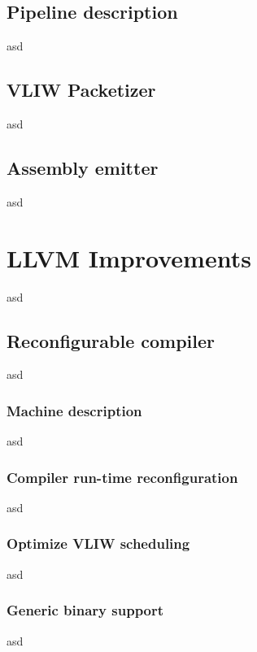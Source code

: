 \subsection{Pipeline description}
asd
\subsection{VLIW Packetizer}
asd
\subsection{Assembly emitter}
asd

\section{LLVM Improvements}
asd
\subsection{Reconfigurable compiler}
asd
\subsubsection{Machine description}
asd
\subsubsection{Compiler run-time reconfiguration}
asd
\subsubsection{Optimize VLIW scheduling}
asd
\subsubsection{Generic binary support}
asd


\acresetall
